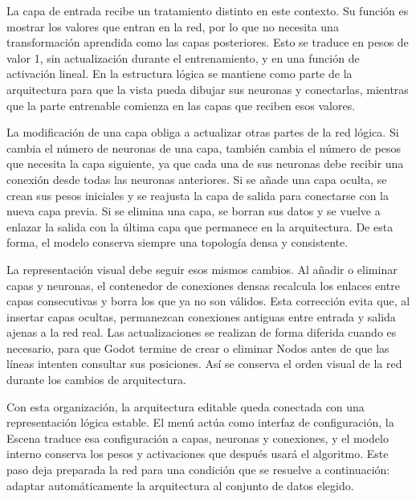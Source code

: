 La capa de entrada recibe un tratamiento distinto en este contexto.
Su función es mostrar los valores que entran en la red, por lo que no necesita una transformación aprendida como las capas posteriores.
Esto se traduce en pesos de valor 1, sin actualización durante el entrenamiento, y en una función de activación lineal.
En la estructura lógica se mantiene como parte de la arquitectura para que la vista pueda dibujar sus neuronas y conectarlas, mientras que la parte entrenable comienza en las capas que reciben esos valores.


La modificación de una capa obliga a actualizar otras partes de la red lógica.
Si cambia el número de neuronas de una capa, también cambia el número de pesos que necesita la capa siguiente, ya que cada una de sus neuronas debe recibir una conexión desde todas las neuronas anteriores.
Si se añade una capa oculta, se crean sus pesos iniciales y se reajusta la capa de salida para conectarse con la nueva capa previa.
Si se elimina una capa, se borran sus datos y se vuelve a enlazar la salida con la última capa que permanece en la arquitectura.
De esta forma, el modelo conserva siempre una topología densa y consistente.

La representación visual debe seguir esos mismos cambios.
Al añadir o eliminar capas y neuronas, el contenedor de conexiones densas recalcula los enlaces entre capas consecutivas y borra los que ya no son válidos.
Esta corrección evita que, al insertar capas ocultas, permanezcan conexiones antiguas entre entrada y salida ajenas a la red real.
Las actualizaciones se realizan de forma diferida cuando es necesario, para que Godot termine de crear o eliminar \gls{Nodo}s antes de que las líneas intenten consultar sus posiciones.
Así se conserva el orden visual de la red durante los cambios de arquitectura.

Con esta organización, la arquitectura editable queda conectada con una representación lógica estable.
El menú actúa como interfaz de configuración, la \gls{Escena} traduce esa configuración a capas, neuronas y conexiones, y el modelo interno conserva los pesos y activaciones que después usará el algoritmo.
Este paso deja preparada la red para una condición que se resuelve a continuación: adaptar automáticamente la arquitectura al conjunto de datos elegido.


